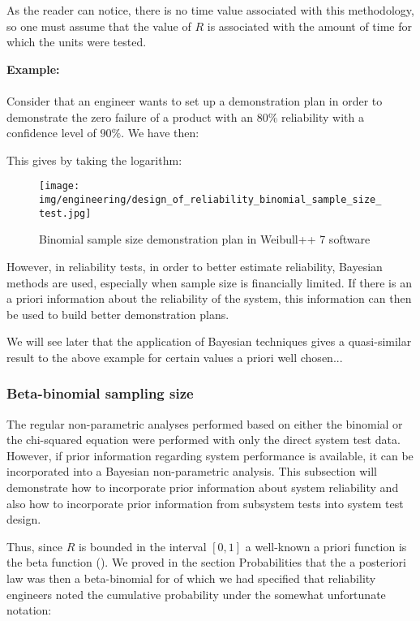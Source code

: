 	As the reader can notice, there is no time value associated with this methodology, so one must assume that the value of $R$  is associated with the amount of time for which the units were tested.
	\begin{tcolorbox}[colframe=black,colback=white,sharp corners]
	\textbf{{\Large {}}Example:}\\\\
	Consider that an engineer wants to set up a demonstration plan in order to demonstrate the zero failure of a product with an $80\%$ reliability with a confidence level of $90\%$. We have then:
	
	This gives by taking the logarithm:
	
	\begin{figure}[H]
		\centering
		\texttt{[image: img/engineering/design\_of\_reliability\_binomial\_sample\_size\_test.jpg]}
		\caption{Binomial sample size demonstration plan in Weibull++ 7  software}
	\end{figure}
	\end{tcolorbox}
	However, in reliability tests, in order to better estimate reliability, Bayesian methods are used, especially when sample size is financially limited. If there is an a priori information about the reliability of the system, this information can then be used to build better demonstration plans.
	
	We will see later that the application of Bayesian techniques gives a quasi-similar result to the above example for certain values a priori well chosen...
	
	\subsubsection{Beta-binomial sampling size}
	The regular non-parametric analyses performed based on either the binomial or the chi-squared equation were performed with only the direct system test data. However, if prior information regarding system performance is available, it can be incorporated into a Bayesian non-parametric analysis. This subsection will demonstrate how to incorporate prior information about system reliability and also how to incorporate prior information from subsystem tests into system test design.

	Thus, since $R$ is bounded in the interval $[0, 1]$ a well-known a priori function is the beta function (). We proved in the section Probabilities that the a posteriori law was then a beta-binomial for of which we had specified that reliability engineers noted the cumulative probability under the somewhat unfortunate notation:
	
